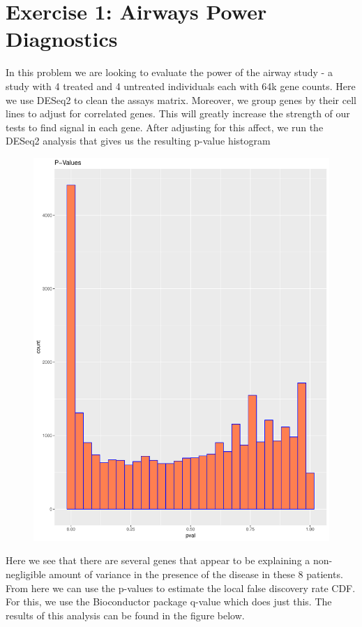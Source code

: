 \documentclass[11pt]{article}
\begin{document}
\section{Exercise 1: Airways Power Diagnostics}

In this problem we are looking to evaluate the power of the airway study - a study with 4 treated and 4 untreated individuals each with 64k gene counts. Here we use DESeq2 to clean the assays matrix. Moreover, we group genes by their cell lines to adjust for correlated genes. This will greatly increase the strength of our tests to find signal in each gene. After adjusting for this affect, we run the DESeq2 analysis that gives us the resulting p-value histogram 
\begin{figure}[h!]
	\centering
	\includegraphics[scale = 0.25]{figures/p-values.pdf}
\end{figure}
Here we see that there are several genes that appear to be explaining a non-negligible amount of variance in the presence of the disease in these 8 patients. From here we can use the p-values to estimate the local false discovery rate CDF. For this, we use the Bioconductor package q-value which does just this. The results of this analysis can be found in the figure below.
\end{document}
